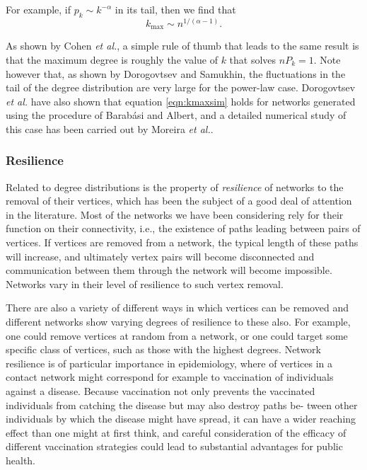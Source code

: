         For example, if $p_k \sim k^{−\alpha}$ in its tail, then we find that
        \begin{equation}
          k_{\mbox{max}} \sim n^{1/(\alpha-1)}\mbox{.} \label{eqn:kmaxsim}
        \end{equation}
        
        As shown by Cohen \textit{et al.}\cite{CohenErezAvrahamHavlin2000}, a simple rule of thumb that leads to the same result is that the maximum degree is roughly the value of $k$ that solves $nP_k = 1$. Note however that, as shown by Dorogovtsev and Samukhin\cite{DorogovtsevSamukhin2003}, the fluctuations in the tail of the degree distribution are very large for the power-law case. Dorogovtsev \textit{et al.}\cite{DorogovtsevMendesSamukhin2001} have also shown that equation \ref{eqn:kmaxsim} holds for networks generated using the  procedure of Barabási and Albert\cite{BarabasiAlbert1999}, and a detailed numerical study of this case has been carried out by Moreira \textit{et al.}\cite{MoreiraAndradeAmaral2002}.
        
    \subsubsection{Resilience}
    
      Related to degree distributions is the property of \emph{resilience} of networks to the removal of their vertices, which has been the subject of a good deal of attention in the literature. Most of the networks we have been considering rely for their function on their connectivity, i.e., the existence of paths leading between pairs of vertices. If vertices are removed from a network, the typical length of these paths will increase, and ultimately vertex pairs will become disconnected and communication between them through the network will become impossible. Networks vary in their level of resilience to such vertex removal.
      
      There are also a variety of different ways in which vertices can be removed and different networks show varying degrees of resilience to these also. For example, one could remove vertices at random from a network, or one could target some specific class of vertices, such as those with the highest degrees. Network resilience is of particular importance in epidemiology, where  of vertices in a contact network might correspond for example to vaccination of individuals against a disease. Because vaccination not only prevents the vaccinated individuals from catching the disease but may also destroy paths be- tween other individuals by which the disease might have spread, it can have a wider reaching effect than one might at first think, and careful consideration of the efficacy of different vaccination strategies could lead to substantial advantages for public health.
      
